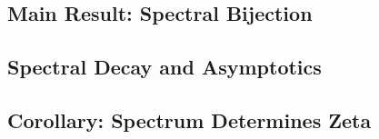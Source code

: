 \subsection{Main Result: Spectral Bijection}








\subsection{Spectral Decay and Asymptotics}




\subsection{Corollary: Spectrum Determines Zeta}









